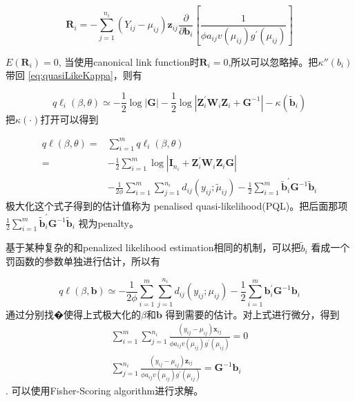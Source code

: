 \documentclass[
]{book}
\theoremstyle{definition}
\theoremstyle{definition}
\theoremstyle{definition}
\theoremstyle{remark}
\begin{document}
\[
\mathbf{R}_{i}=-\sum_{j=1}^{n_{i}}\left(Y_{i j}-\mu_{i j}\right) \mathbf{z}_{i j} \frac{\partial}{\partial \mathbf{b}_{i}}\left[\frac{1}{\phi a_{i j} v\left(\mu_{i j}\right) g^{\prime}\left(\mu_{i j}\right)}\right]
\]

\(E(\boldsymbol R_i)=0\),
当使用canonical link function时\(\boldsymbol R_i=0\),所以可以忽略掉。把\(\kappa''(b_i)\)带回 \eqref{eq:quasiLikeKappa}，则有

\[
q \ell_{i}(\beta, \theta) \simeq-\frac{1}{2} \log |\mathbf{G}|-\frac{1}{2} \log \left|\mathbf{Z}_{i}^{\prime} \mathbf{W}_{i} \mathbf{Z}_{i}+\mathbf{G}^{-1}\right|-\kappa\left(\tilde{\mathbf{b}}_{i}\right)
\]
把\(\kappa(\cdot)\)打开可以得到

\[
\begin{aligned} q \ell(\beta, \theta)=& \sum_{i=1}^{m} q \ell_{i}(\beta, \theta) \\=&-\frac{1}{2} \sum_{i=1}^{m} \log \left|\mathbf{I}_{n_{i}}+\mathbf{Z}_{i}^{\prime} \mathbf{W}_{i} \mathbf{Z}_{i} \mathbf{G}\right| \\ &-\frac{1}{2 \phi} \sum_{i=1}^{m} \sum_{j=1}^{n_{i}} d_{i j}\left(y_{i j} ; \tilde{\mu}_{i j}\right)-\frac{1}{2} \sum_{i=1}^{m} \tilde{\mathbf{b}}_{i}^{\prime} \mathbf{G}^{-1} \tilde{\mathbf{b}}_{i} \end{aligned}
\]
极大化这个式子得到的估计值称为 penalised quasi-likelihood(PQL)。把后面那项\(\frac{1}{2} \sum_{i=1}^{m} \tilde{\mathbf{b}}_{i}^{\prime} \mathbf{G}^{-1} \tilde{\mathbf{b}}_{i}\) 视为penalty。

基于某种复杂的和penalized likelihood estimation相同的机制，可以把\(\tilde b_i\) 看成一个罚函数的参数单独进行估计，所以有

\[
q \ell(\beta, \mathbf{b}) \simeq-\frac{1}{2 \phi} \sum_{i=1}^{m} \sum_{j=1}^{n_{i}} d_{i j}\left(y_{i j} ; \mu_{i j}\right)-\frac{1}{2} \sum_{i=1}^{m} \mathbf{b}_{i}^{\prime} \mathbf{G}^{-1} \mathbf{b}_{i}
\]
通过分别找�使得上式极大化的\(\beta\)和\(\boldsymbol b\) 得到需要的估计。对上式进行微分，得到
\[
\begin{array}{c}{\sum_{i=1}^{m} \sum_{j=1}^{n_{i}} \frac{\left(y_{i j}-\mu_{i j}\right) \mathbf{x}_{i j}}{\phi a_{i j} v\left(\mu_{i j}\right) g^{\prime}\left(\mu_{i j}\right)}=0} \\ {\sum_{j=1}^{n_{i}} \frac{\left(y_{i j}-\mu_{i j}\right) \mathbf{z}_{i j}}{\phi a_{i j} v\left(\mu_{i j}\right) g^{\prime}\left(\mu_{i j}\right)}=\mathbf{G}^{-1} \mathbf{b}_{i}}\end{array}
\]
.
可以使用Fisher-Scoring algorithm进行求解。
\end{document}
